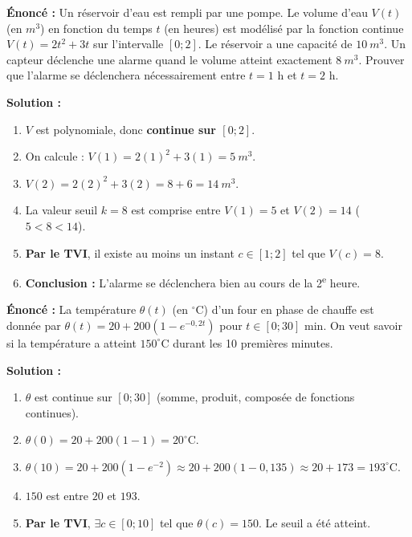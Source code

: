\documentclass[11pt]{article}
\begin{document}
\begin{exoresolu}
\textbf{Énoncé :} Un réservoir d'eau est rempli par une pompe. Le volume d'eau $V(t)$ (en $m^3$) en fonction du temps $t$ (en heures) est modélisé par la fonction continue $V(t) = 2t^2 + 3t$ sur l'intervalle $[0 ; 2]$. Le réservoir a une capacité de $10~m^3$. Un capteur déclenche une alarme quand le volume atteint exactement $8~m^3$. Prouver que l'alarme se déclenchera nécessairement entre $t=1$ h et $t=2$ h.
\par
\textbf{Solution :}
\begin{enumerate}
    \item $V$ est polynomiale, donc \textbf{continue sur $[0;2]$}.
    \item On calcule : $V(1) = 2(1)^2 + 3(1) = 5~m^3$.
    \item $V(2) = 2(2)^2 + 3(2) = 8 + 6 = 14~m^3$.
    \item La valeur seuil $k = 8$ est comprise entre $V(1)=5$ et $V(2)=14$ ($5 < 8 < 14$).
    \item \textbf{Par le TVI}, il existe au moins un instant $c \in [1 ; 2]$ tel que $V(c) = 8$.
    \item \textbf{Conclusion :} L'alarme se déclenchera bien au cours de la 2\textsuperscript{e} heure.
\end{enumerate}
\end{exoresolu}

\begin{exoresolu}
\textbf{Énoncé :} La température $\theta(t)$ (en $^\circ$C) d'un four en phase de chauffe est donnée par $\theta(t) = 20 + 200(1 - e^{-0,2t})$ pour $t \in [0 ; 30]$ min. On veut savoir si la température a atteint $150^\circ$C durant les 10 premières minutes.
\par
\textbf{Solution :}
\begin{enumerate}
    \item $\theta$ est continue sur $[0;30]$ (somme, produit, composée de fonctions continues).
    \item $\theta(0) = 20 + 200(1-1) = 20^\circ$C.
    \item $\theta(10) = 20 + 200(1 - e^{-2}) \approx 20 + 200(1 - 0,135) \approx 20 + 173 = 193^\circ$C.
    \item $150$ est entre $20$ et $193$.
    \item \textbf{Par le TVI}, $\exists c \in [0;10]$ tel que $\theta(c) = 150$. Le seuil a été atteint.
\end{enumerate}
\end{exoresolu}
\end{document}

